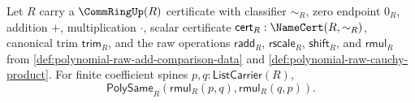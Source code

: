 \begin{theorem}
\label{thm:polynomial-raw-multiplication-commutativity-from-commring-scalars}
Let $R$ carry a $\CommRingUp(R)$ certificate with classifier $\sim_R$, zero endpoint $0_R$, addition $+$, multiplication $\cdot$, scalar certificate $\mathsf{cert}_R:\NameCert(R,\sim_R)$, canonical trim $\mathsf{trim}_R$, and the raw operations $\mathsf{radd}_R$, $\mathsf{rscale}_R$, $\mathsf{shift}_R$, and $\mathsf{rmul}_R$ from \autoref{def:polynomial-raw-add-comparison-data} and \autoref{def:polynomial-raw-cauchy-product}. For finite coefficient spines $p,q:\mathsf{ListCarrier}(R)$,
$$
\mathsf{PolySame}_R(\mathsf{rmul}_R(p,q),\mathsf{rmul}_R(q,p)).
$$
\end{theorem}
